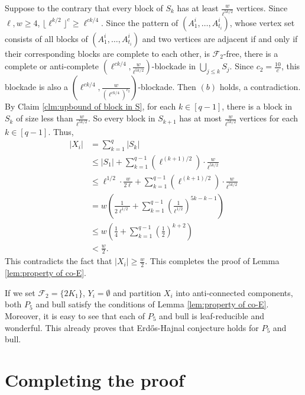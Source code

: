 \documentclass[a4paper,11pt]{article}
\let\oldendproof\endproof
\renewenvironment{proof}[1][\proofname]{%
	\oldproof[\normalfont\bfseries #1]%
}{\oldendproof}
\renewcommand{\qedsymbol}{$\square$}%
\newenvironment{subproof}[1][\normalfont\it Subproof]{%
	\renewcommand{\qedsymbol}{{\tiny{$\blacksquare$}}}%
	\begin{proof}[#1]%
	}{%
	\end{proof}%
}
\begin{document}
\begin{proof}
\begin{subproof}[Proof of Claim \ref{clm:upbound of block in S}]
            Suppose to the contrary that every block of $S_k$ has at least $\frac{w}{\ell^{5k/2}}$ vertices.  
            Since $\ell, w\geq 4$, $\lfloor \ell^{k/2}\rfloor^c\geq \ell^{ck/4}$.
            Since the pattern of $(A^i_1,\ldots, A^i_{t_i})$, whose vertex set consists of all blocks of $(A^i_1,\ldots, A^i_{t_i})$ and two vertices are adjacent if and only if their corresponding blocks are complete to each other, is $\mathcal{F}_2$-free, there is a complete or anti-complete $(\ell^{ck/4}, \frac{w}{\ell^{5k/2}})$-blockade in $\bigcup_{j\leq k} S_j$.
            Since $c_2=\frac{10}{c}$, this blockade is also a $(\ell^{ck/4}, \frac{w}{(\ell^{ck/4})^{c_2}})$-blockade.
            Then $(b)$ holds, a contradiction. 
        \end{subproof}
        By Claim \ref{clm:upbound of block in S}, for each $k\in[q-1]$, there is a block in $S_k$ of size less than $\frac{w}{\ell^{5k/2}}$. 
        So every block in $S
        _{k+1}$ has at most $\frac{w}{\ell^{5k/2}}$ vertices for each $k\in[q-1]$. 
        Thus, 
        \begin{align*}
            |X_i|&=\sum_{k=1}^q |S_k|\\
                 &\leq |S_1|+\sum_{k=1}^{q-1} (\ell^{(k+1)/2})\cdot \frac{w}{\ell^{5k/2}}\\
                 &\leq \ell^{1/2}\cdot \frac{w}{2\ell}+\sum_{k=1}^{q-1} (\ell^{(k+1)/2})\cdot \frac{w}{\ell^{5k/2}}\\
                 &= w(\frac{1}{2\ell^{1/2}}+\sum_{k=1}^{q-1} (\frac{1}{\ell^{1/2}})^{5k-k-1})\\
                 &\leq w(\frac{1}{4}+\sum_{k=1}^{q-1}(\frac{1}{2})^{k+2})\\
                 &<\frac{w}{2}. 
        \end{align*}
        This contradicts the fact that $|X_i|\geq \frac{w}{2}$. 
        This completes the proof of Lemma \ref{lem:property of co-E}.
    \end{proof}

     If we set $\mathcal{F}_2=\{2K_1\}$, $Y_i=\emptyset$ and partition $X_i$ into anti-connected components, both $P_5$ and bull satisfy the conditions of Lemma \ref{lem:property of co-E}. Moreover, it is easy to see that each of $P_5$ and bull is leaf-reducible and wonderful. 
    This already proves that Erd\H{o}s-Hajnal conjecture holds for $P_5$ and bull.
    
    \section{Completing the proof}\label{sec:deducing structure}
\end{document}

